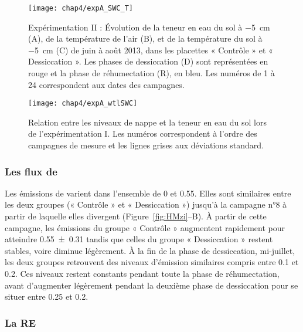 \begin{figure}
\centering
\texttt{[image: chap4/expA\_SWC\_T]}
\caption{Expérimentation II : Évolution de la teneur en eau du sol à \SI{-5}{\centi\metre} (A), de la température de l'air (B), et de la température du sol à \SI{-5}{\centi\metre} (C) de juin à août 2013, dans les placettes « Contrôle » et « Dessiccation ». Les phases de dessiccation (D) sont représentées en rouge et la phase de réhumectation (R), en bleu. Les numéros de 1 à 24 correspondent aux dates des campagnes.}
\label{fig:HMzi_T}
\end{figure}


\begin{figure}
\centering
\texttt{[image: chap4/expA\_wtlSWC]}
\caption{Relation entre les niveaux de nappe et la teneur en eau du sol lors de l'expérimentation I. Les numéros correspondent à l'ordre des campagnes de mesure et les lignes grises aux déviations standard.}
\label{fig:wtlSWC_A}
\end{figure}

\subsubsection{Les flux de \chh}

Les émissions de \chh varient dans l'ensemble de 0 et \SI{0.55}{\uml}.
Elles sont similaires entre les deux groupes (« Contrôle » et « Dessiccation ») jusqu'à la campagne n°8 à partir de laquelle elles divergent (Figure~\ref{fig:HMzi}--B).
À partir de cette campagne, les émissions du groupe « Contrôle » augmentent rapidement pour atteindre \SI{0.55(031)}{\uml} tandis que celles du groupe « Dessiccation » restent stables, voire diminue légèrement.
À la fin de la phase de dessiccation, mi-juillet, les deux groupes retrouvent des niveaux d'émission similaires compris entre \num{0.1} et \SI{0.2}{\uml}.
Ces niveaux restent constants pendant toute la phase de réhumectation, avant d'augmenter légèrement pendant la deuxième phase de dessiccation pour se situer entre \SI{0.25}{\uml} et \SI{0.2}{\uml}.

\subsubsection{La RE}

